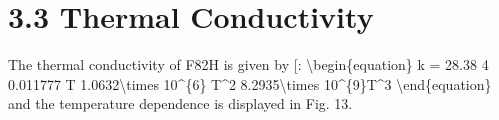 \documentclass[letterpaper,10pt,english]{jupyterBook}
\begin{document}
	
	\section{3.3 Thermal Conductivity}
	\label{\detokenize{3 Thermophysical Properties:thermal-conductivity}}
	\sphinxAtStartPar
	The thermal conductivity of F82H is given by {[}\sphinxhref{https://drive.google.com/file/d/1EAKnctMi6BqWtE4DrxCDe5L8niCH0WDe/view?usp=drive\_link}{TavassoliRensman2002}{]}:
	\textbackslash{}begin\{equation\}
	k = 28.38 4\sphinxhyphen{} 0.011777 T \sphinxhyphen{} 1.0632\textbackslash{}times 10\textasciicircum{}\{\sphinxhyphen{}6\} T\textasciicircum{}2 \sphinxhyphen{} 8.2935\textbackslash{}times 10\textasciicircum{}\{\sphinxhyphen{}9\}T\textasciicircum{}3
	\textbackslash{}end\{equation\}
	and the temperature dependence is displayed in Fig. 13.
	
\end{document}
